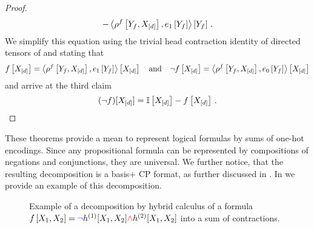 \begin{proof}
\begin{align*}
        - \left\langle \rho^{f}\left[Y_{f},X_{[d]}\right],e_1\left[Y_{f}\right]\right\rangle \left[ Y_{f} \right] \, .
    \end{align*}
    We simplify this equation using the trivial head contraction identity of directed tensors of  and  stating that
    \begin{align*}
        f\left[X_{[d]}\right] = \left\langle \rho^{f}\left[Y_{f},X_{[d]}\right],e_1\left[Y_{f}\right]\right\rangle \left[ X_{[d]} \right]
        \quad \text{and} \quad
        \lnot f\left[X_{[d]}\right] = \left\langle \rho^{f}\left[Y_{f},X_{[d]}\right],e_0\left[Y_{f}\right]\right\rangle \left[ X_{[d]} \right]
    \end{align*}
    and arrive at the third claim
        \begin{align*}
    (\lnot f)[X_{[d]}]
        = \mathbb{I}\left[X_{[d]}\right] - f\left[X_{[d]}\right]  \, .
    \end{align*}
\end{proof}

These theorems provide a mean to represent logical formulas by sums of one-hot encodings.
Since any propositional formula can be represented by compositions of negations and conjunctions, they are universal.
We further notice, that the resulting decomposition is a basis+ CP format, as further discussed in .
In  we provide an example of this decomposition.


\begin{figure}
    \begin{center}
        
    \end{center}
    \caption{
        Example of a decomposition by hybrid calculus of a formula
        $f\left[X_{1},X_{2}\right] = \textcolor{blue}{\lnot} h^{(1)}[X_{1},X_{2}] \textcolor{red}{\land}  h^{(2)}[X_{1},X_{2}]$ into a sum of contractions.
    }\label{fig:DecompositionExample}
\end{figure}






